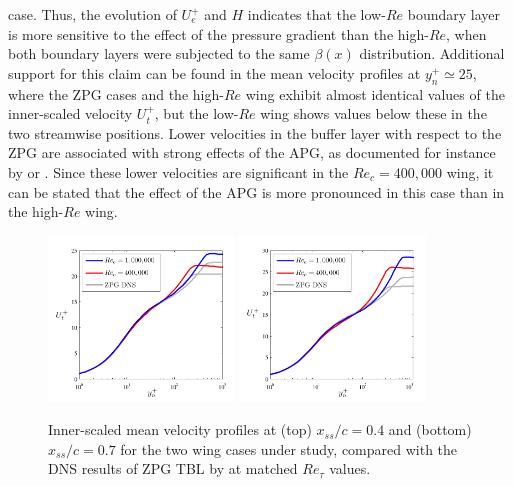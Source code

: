 \documentclass[preprint,12pt,authoryear]{elsarticle}
\begin{document}
case. Thus, the evolution of $U^{+}_{e}$ and $H$ indicates that the low-$Re$ boundary layer is more sensitive to the effect of the pressure gradient than the high-$Re$, when both boundary layers were subjected to the same $\beta(x)$ distribution. Additional support for this claim can be found in the mean velocity profiles at $y^{+}_{n} \simeq 25$, where the ZPG cases and the high-$Re$ wing exhibit almost identical values of the inner-scaled velocity $U^{+}_{t}$, but the low-$Re$ wing shows values below these in the two streamwise positions. Lower velocities in the buffer layer with respect to the ZPG are associated with strong effects of the APG, as documented for instance by \cite{spalart_watmuff} or \cite{bobke_et_al}. Since these lower velocities are significant in the $Re_{c}=400,000$ wing, it can be stated that the effect of the APG is more pronounced in this case than in the high-$Re$ wing.
\begin{figure}[t]
\centering
\includegraphics[width=0.44\textwidth]{Up_vs_yp_04}
\includegraphics[width=0.44\textwidth]{Up_vs_yp_07}
\caption{Inner-scaled mean velocity profiles at (top) $x_{ss}/c=0.4$ and (bottom) $x_{ss}/c=0.7$ for the two wing cases under study, compared with the DNS results of ZPG TBL by \cite{schlatter_orlu10} at matched $Re_{\tau}$ values.}
\label{Up_vs_yp}
\end{figure}
\end{document}
